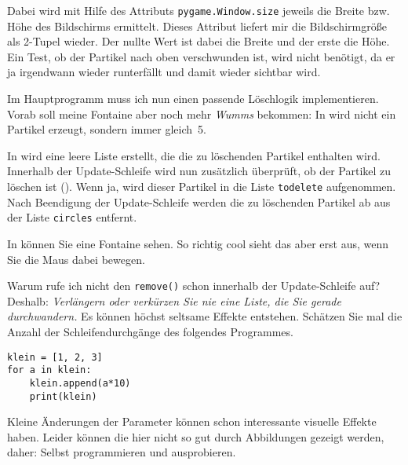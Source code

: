 Dabei wird mit Hilfe des Attributs \texttt{pygame.Window.size} jeweils die Breite bzw. Höhe des Bildschirms ermittelt. Dieses Attribut liefert mir die Bildschirmgröße als 2-Tupel wieder. Der nullte Wert ist dabei die Breite und der erste die Höhe. Ein Test, ob der Partikel nach oben verschwunden ist, wird nicht benötigt, da er ja irgendwann wieder runterfällt und damit wieder sichtbar wird.

\newpage
{}

Im Hauptprogramm muss ich nun einen passende Löschlogik implementieren. Vorab soll meine Fontaine aber noch mehr \emph{Wumms} bekommen: In  wird nicht ein Partikel erzeugt, sondern immer gleich~5.

In  wird eine leere Liste erstellt, die die zu löschenden Partikel enthalten wird. Innerhalb der Update-Schleife wird nun zusätzlich überprüft, ob der Partikel zu löschen ist (). Wenn ja, wird dieser Partikel in die Liste \texttt{todelete} aufgenommen. Nach Beendigung der Update-Schleife werden die zu löschenden Partikel ab  aus der Liste \texttt{circles} entfernt.

In  können Sie eine Fontaine sehen. So richtig cool sieht das aber erst aus, wenn Sie die Maus dabei bewegen.


Warum rufe ich nicht den \texttt{remove()} schon innerhalb der Update-Schleife auf? Deshalb: \emph{Verlängern oder verkürzen Sie nie eine Liste, die Sie gerade durchwandern.} Es können höchst seltsame Effekte entstehen. Schätzen Sie mal die Anzahl der Schleifendurchgänge des folgendes Programmes.

\begin{lstlisting}[firstnumber=1]
klein = [1, 2, 3]
for a in klein:
    klein.append(a*10)
    print(klein)	
\end{lstlisting}

Kleine Änderungen der Parameter können schon interessante visuelle Effekte haben. Leider können die hier nicht so gut durch Abbildungen gezeigt werden, daher: Selbst programmieren und ausprobieren.


